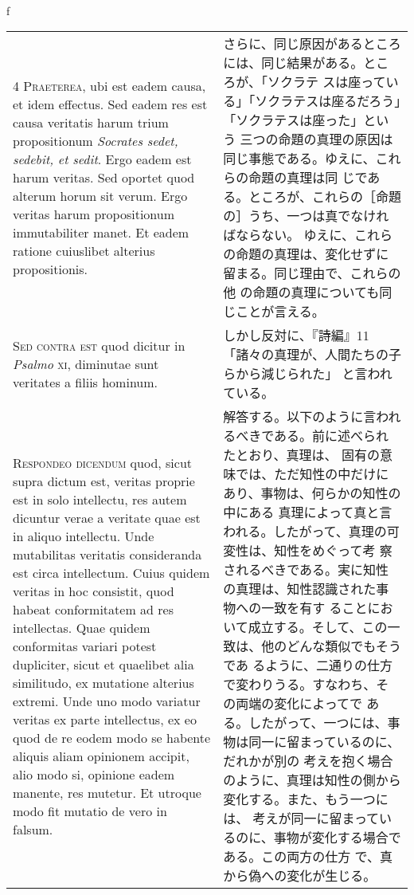 \\f\documentclass[10pt]{jsarticle} %
\begin{document}
\begin{longtable}{p{21em}p{21em}}
\\

{\scshape 4 Praeterea}, ubi est eadem causa, et idem effectus. Sed
eadem res est causa veritatis harum trium propositionum {\itshape
Socrates sedet, sedebit, et sedit}. Ergo eadem est harum veritas. Sed
oportet quod alterum horum sit verum. Ergo veritas harum propositionum
immutabiliter manet. Et eadem ratione cuiuslibet alterius
propositionis.

&

さらに、同じ原因があるところには、同じ結果がある。ところが、「ソクラテ
スは座っている」「ソクラテスは座るだろう」「ソクラテスは座った」という
三つの命題の真理の原因は同じ事態である。ゆえに、これらの命題の真理は同
じである。ところが、これらの［命題の］うち、一つは真でなければならない。
ゆえに、これらの命題の真理は、変化せずに留まる。同じ理由で、これらの他
の命題の真理についても同じことが言える。

\\

{\scshape Sed contra est} quod dicitur in {\itshape Psalmo} {\scshape
xi}, diminutae sunt veritates a filiis hominum.

&

 しかし反対に、『詩編』11「諸々の真理が、人間たちの子らから減じられた」
 と言われている。


\\

{\scshape Respondeo dicendum} quod, sicut supra dictum est, veritas
proprie est in solo intellectu, res autem dicuntur verae a veritate
quae est in aliquo intellectu. Unde mutabilitas veritatis consideranda
est circa intellectum. Cuius quidem veritas in hoc consistit, quod
habeat conformitatem ad res intellectas. Quae quidem conformitas
variari potest dupliciter, sicut et quaelibet alia similitudo, ex
mutatione alterius extremi. Unde uno modo variatur veritas ex parte
intellectus, ex eo quod de re eodem modo se habente aliquis aliam
opinionem accipit, alio modo si, opinione eadem manente, res
mutetur. Et utroque modo fit mutatio de vero in falsum.

&

解答する。以下のように言われるべきである。前に述べられたとおり、真理は、
固有の意味では、ただ知性の中だけにあり、事物は、何らかの知性の中にある
真理によって真と言われる。したがって、真理の可変性は、知性をめぐって考
察されるべきである。実に知性の真理は、知性認識された事物への一致を有す
ることにおいて成立する。そして、この一致は、他のどんな類似でもそうであ
るように、二通りの仕方で変わりうる。すなわち、その両端の変化によってで
ある。したがって、一つには、事物は同一に留まっているのに、だれかが別の
考えを抱く場合のように、真理は知性の側から変化する。また、もう一つには、
考えが同一に留まっているのに、事物が変化する場合である。この両方の仕方
で、真から偽への変化が生じる。


\end{longtable}
\end{document}
